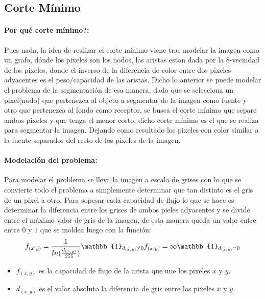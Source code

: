 \documentclass[a4paper,10pt,twocolumn]{article}
\begin{document}
\subsection{Corte M\'inimo}

\paragraph*{Por qu\'e corte m\'inimo?:}
Pues nada, la idea de realizar el corte m\'inimo viene tras modelar la imagen como un grafo, d\'onde los pixeles son los nodos,
las aristas estan dada por la 8-vecindad de los pixeles, donde el inverso de la diferencia de color
entre dos pixeles adyacentes es el peso/capacidad de las aristas. Dicho lo anterior se puede modelar el problema de la segmentaci\'on de esa manera,
dado que se selecciona un pixel(nodo) que pertenezca al objeto a segmentar de la imagen como fuente y otro que pertenezca al fondo como receptor,
se busca el corte m\'inimo que separe ambos pixeles y que tenga el menor costo, dicho corte m\'inimo es el que se realiza para segmentar la imagen.
Dejando como resultado los pixeles con color similar a la fuente separados del resto de los pixeles de la imagen.

\paragraph*{Modelaci\'on del problema:}
Para modelar el problema se lleva la imagen a escala de grises con lo que se convierte todo el problema a simplemente 
determinar que tan distinto es el gris de un pixel a otro. Para sopesar cada capacidad de flujo lo que se hace es determinar la
diferencia entre los grises de ambos pieles adyacentes y se divide entre el m\'aximo valor de gris de la imagen, de esta manera
queda un valor entre entre $0$ y $1$ que se moldea luego con la funci\'on:\\
\begin{equation}
	f_{(x,y)} = \frac{1}{ln(\frac{d_{(x,y)}}{255})} \mathbb{1}_{d_{(x,y)} \neq 0}\\
	f_{(x,y)} = \infty \mathbb{1}_{d_{(x,y)} = 0}
\end{equation}
\begin{itemize}
	\item $f_{(x,y)}$ es la capacidad de flujo de la arista que une los pixeles $x$ y $y$.
	\item $d_{(x,y)}$ es el valor absoluto la diferencia de gris entre los pixeles $x$ y $y$.
\end{itemize}
\end{document}
